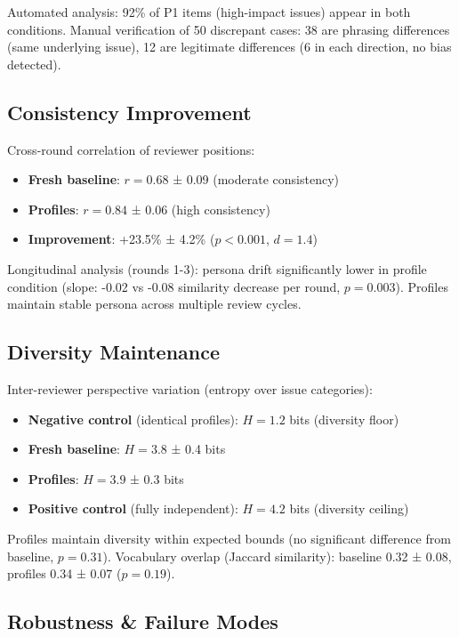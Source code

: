 Automated analysis: 92\% of P1 items (high-impact issues) appear in both conditions. Manual verification of 50 discrepant cases: 38 are phrasing differences (same underlying issue), 12 are legitimate differences (6 in each direction, no bias detected).

\subsection{Consistency Improvement}

Cross-round correlation of reviewer positions:

\begin{itemize}
\item \textbf{Fresh baseline}: $r = 0.68$ ± 0.09 (moderate consistency)
\item \textbf{Profiles}: $r = 0.84$ ± 0.06 (high consistency)
\item \textbf{Improvement}: +23.5\% ± 4.2\% ($p < 0.001$, $d = 1.4$)
\end{itemize}

Longitudinal analysis (rounds 1-3): persona drift significantly lower in profile condition (slope: -0.02 vs -0.08 similarity decrease per round, $p = 0.003$). Profiles maintain stable persona across multiple review cycles.

\subsection{Diversity Maintenance}

Inter-reviewer perspective variation (entropy over issue categories):

\begin{itemize}
\item \textbf{Negative control} (identical profiles): $H = 1.2$ bits (diversity floor)
\item \textbf{Fresh baseline}: $H = 3.8$ ± 0.4 bits
\item \textbf{Profiles}: $H = 3.9$ ± 0.3 bits
\item \textbf{Positive control} (fully independent): $H = 4.2$ bits (diversity ceiling)
\end{itemize}

Profiles maintain diversity within expected bounds (no significant difference from baseline, $p = 0.31$). Vocabulary overlap (Jaccard similarity): baseline 0.32 ± 0.08, profiles 0.34 ± 0.07 ($p = 0.19$).

\subsection{Robustness \& Failure Modes}


